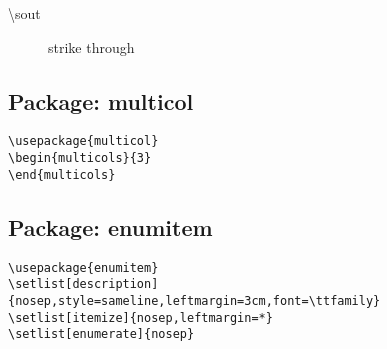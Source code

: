 \begin{description}
\item [\textbackslash sout] strike through
\end{description}


\subsection{Package: multicol}
\begin{lstlisting}
\usepackage{multicol}
\begin{multicols}{3}
\end{multicols}
\end{lstlisting}

\subsection{Package: enumitem}
\begin{lstlisting}
\usepackage{enumitem}
\setlist[description]{nosep,style=sameline,leftmargin=3cm,font=\ttfamily}
\setlist[itemize]{nosep,leftmargin=*}
\setlist[enumerate]{nosep}
\end{lstlisting}


